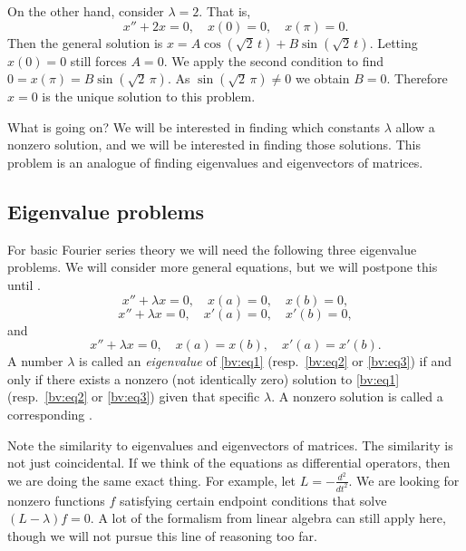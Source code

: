 \begin{example}
On the other hand, consider $\lambda = 2$.  That is,
\begin{equation*}
x'' + 2 x = 0, \quad x(0) = 0, \quad x(\pi) = 0.
\end{equation*}
Then the general solution is
$x= A \cos (\! \sqrt{2}\,t) + B \sin (\! \sqrt{2}\,t)$.  Letting $x(0) = 0$ still
forces $A = 0$.  We apply the second condition to find
$0=x(\pi) = B \sin (\! \sqrt{2}\,\pi)$.
As $\sin (\! \sqrt{2}\,\pi) \not= 0$ we obtain
$B = 0$.  Therefore $x=0$ is the unique solution to this problem.
\end{example}

What is going on?  We will be interested in finding which
constants $\lambda$ allow a nonzero solution, and we will be interested in
finding those solutions.  This problem is an analogue of finding
eigenvalues and eigenvectors of matrices.  

\subsection{Eigenvalue problems}

For basic Fourier series theory we will need
the following three eigenvalue problems.
We will consider more general equations,
but we will postpone this until
.
\begin{equation} \label{bv:eq1}
x'' + \lambda x = 0, \quad x(a) = 0, \quad x(b) = 0 ,
\end{equation}
\begin{equation} \label{bv:eq2}
x'' + \lambda x = 0, \quad x'(a) = 0, \quad x'(b) = 0 ,
\end{equation}
and
\begin{equation} \label{bv:eq3}
x'' + \lambda x = 0, \quad x(a) = x(b), \quad x'(a) = x'(b) .
\end{equation}
A number $\lambda$ is called an
\emph{eigenvalue}
of \eqref{bv:eq1}
(resp.\ \eqref{bv:eq2} or \eqref{bv:eq3}) if and only if
there exists a nonzero (not identically zero) solution to \eqref{bv:eq1}
(resp.\ \eqref{bv:eq2} or \eqref{bv:eq3})
given that specific $\lambda$.  A
nonzero solution is called a corresponding
\emph{}.

Note the similarity to eigenvalues and eigenvectors of matrices.  The
similarity is not just coincidental.  If we think of the equations as
differential operators, then we are doing the same exact thing.  For example, 
let $L = -\frac{d^2}{{dt}^2}$.  We are looking for nonzero functions $f$
satisfying certain endpoint conditions that solve
$(L- \lambda)f = 0$.  A lot of the formalism from linear algebra can still
apply here, though we will not pursue this line of reasoning too far.

